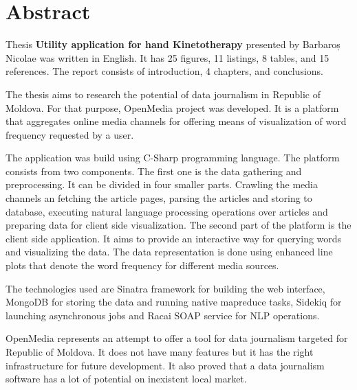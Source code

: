 \section*{Abstract}
Thesis \textbf{Utility application for hand Kinetotherapy} presented by Barbaroș Nicolae was written in English. It has 25 figures, 11 listings, 8 tables, and 15 references. The report consists of introduction, 4 chapters, and conclusions.

The thesis aims to research the potential of data journalism in Republic of Moldova. For that purpose, OpenMedia project was developed. It is a platform that aggregates online media channels for offering means of visualization of word frequency requested by a user.

The application was build using C-Sharp programming language. The platform consists from two components. The first one is the data gathering and preprocessing. It can be divided in four smaller parts. Crawling the media channels an fetching the article pages, parsing the articles and storing to database, executing natural language processing operations over articles and preparing data for client side visualization. The second part of the platform is the client side application. It aims to provide an interactive way for querying words and visualizing the data. The data representation is done using enhanced line plots that denote the word frequency for different media sources.

The technologies used are Sinatra framework for building the web interface, MongoDB for storing the data and running native mapreduce tasks, Sidekiq for launching asynchronous jobs and Racai SOAP service for NLP operations.

OpenMedia represents an attempt to offer a tool for data journalism targeted for Republic of Moldova. It does not have many features but it has the right infrastructure for future development. It also proved that a data journalism software has a lot of potential on inexistent local market.
